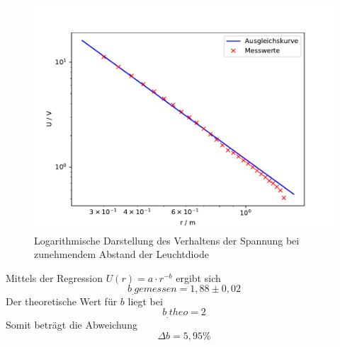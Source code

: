 \begin{figure}
\centering
\includegraphics[width=\linewidth-75pt,height=\textheight-75pt,keepaspectratio]{content/images/plot3.pdf}
\caption{Logarithmische Darstellung des Verhaltens der Spannung bei zunehmendem Abstand der Leuchtdiode}\label{fig:U5}
\end{figure}
Mittels der Regression $U(r)=a\cdot r^{-b}$ ergibt sich
\[
b_.{gemessen}=1,88\pm 0,02
\]
Der theoretische Wert für $b$ liegt bei 
\[
b_.{theo}=2
\]
Somit beträgt die Abweichung
\[
\Delta b = 5,95 \%
\]